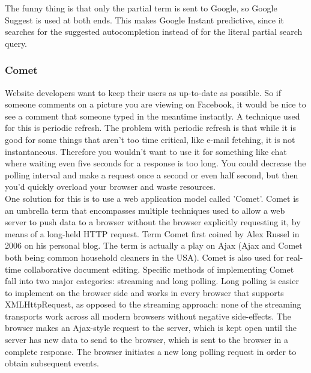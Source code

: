The funny thing is that only the partial term is sent to Google, so Google Suggest is used at both ends. This makes Google Instant predictive, since it searches for the suggested autocompletion instead of for the literal partial search query.\\
	
\subsubsection{Comet}
Website developers want to keep their users as up-to-date as possible. So if someone comments on a picture you are viewing on Facebook, it would be nice to see a comment that someone typed in the meantime instantly. A technique used for this is periodic refresh. The problem with periodic refresh is that while it is good for some things that aren't too time critical, like e-mail fetching, it is not instantaneous. Therefore you wouldn't want to use it for something like chat where waiting even five seconds for a response is too long. You could decrease the polling interval and make a request once a second or even half second, but then you'd quickly overload your browser and waste resources.\\
	
One solution for this is to use a web application model called 'Comet'. Comet is an umbrella term that encompasses multiple techniques  used to allow a web server to push data to a browser without the browser explicitly requesting it, by means of a long-held HTTP request. Term Comet first coined by Alex Russel in 2006 on his personal blog. The term is actually a play on Ajax (Ajax and Comet both being common household cleaners in the USA). Comet is also used for real-time collaborative document editing. Specific methods of implementing Comet fall into two major categories: streaming and long polling. Long polling is easier to implement on the browser side and works in every browser that supports XMLHttpRequest, as opposed to the streaming approach: none of the streaming transports work across all modern browsers without negative side-effects. The browser makes an Ajax-style request to the server, which is kept open until the server has new data to send to the browser, which is sent to the browser in a complete response. The browser initiates a new long polling request in order to obtain subsequent events.
